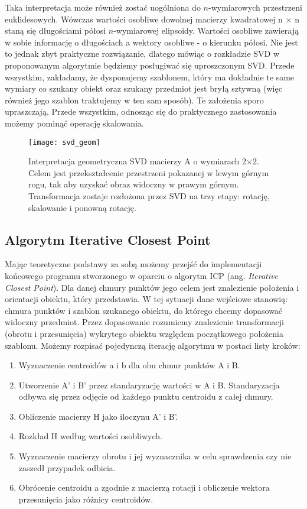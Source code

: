 \documentclass[12pt]{article}
\begin{document}
Taka interpretacja może również zostać uogólniona do $n$-wymiarowych przestrzeni euklidesowych. Wówczas wartości osobliwe dowolnej macierzy kwadratowej n $\times$ n staną się długościami półosi $n$-wymiarowej elipsoidy. Wartości osobliwe zawierają w sobie informację o długościach a wektory osobliwe - o kierunku półosi. Nie jest to jednak zbyt praktyczne rozwiązanie, dlatego mówiąc o rozkładzie SVD w proponowanym algorytmie będziemy posługiwać się uproszczonym SVD. Przede wszystkim, zakładamy, że dysponujemy szablonem, który ma dokładnie te same wymiary co szukany obiekt oraz szukany przedmiot jest bryłą sztywną (więc również jego szablon traktujemy w ten sam sposób). Te założenia sporo upraszczają. Przede wszystkim, odnosząc się do praktycznego zastosowania możemy pominąć operację skalowania.

\begin{figure}[h]
\centering
\texttt{[image: svd\_geom]}
\caption{Interpretacja geometryczna SVD macierzy A o wymiarach 2$\times$2. Celem jest przekształcenie przestrzeni pokazanej w lewym górnym rogu, tak aby uzyskać obraz widoczny w prawym górnym. Transformacja zostaje rozłożona przez SVD na trzy etapy: rotację, skalowanie i ponowną rotację.}
\end{figure}

\subsection{Algorytm Iterative Closest Point}
Mając teoretyczne podstawy za sobą możemy przejść do implementacji końcowego programu stworzonego w oparciu o algorytm ICP (ang. \emph{Iterative Closest Point}). Dla danej chmury punktów jego celem jest znalezienie położenia i orientacji obiektu, który przedstawia. W tej sytuacji dane wejściowe stanowią: chmura punktów i szablon szukanego obiektu, do którego chcemy dopasować widoczny przedmiot. Przez dopasowanie rozumiemy znalezienie transformacji (obrotu i przesunięcia) wykrytego obiektu względem początkowego położenia szablonu. Możemy rozpisać pojedynczą iterację algorytmu w postaci listy kroków:

\begin{enumerate}
\item Wyznaczenie centroidów a i b dla obu chmur punktów A i B.
\item Utworzenie A' i B' przez standaryzację wartości w A i B. Standaryzacja odbywa się przez  odjęcie od każdego punktu centroidu z całej chmury.
\item Obliczenie macierzy H jako iloczynu A' i B'.
\item Rozkład H według wartości osobliwych.
\item Wyznaczenie macierzy obrotu i jej wyznacznika w celu sprawdzenia czy nie zaszedł przypadek odbicia.
\item Obrócenie centroidu a zgodnie z macierzą rotacji i obliczenie wektora przesunięcia jako różnicy centroidów. 
\end{enumerate}
\end{document}
